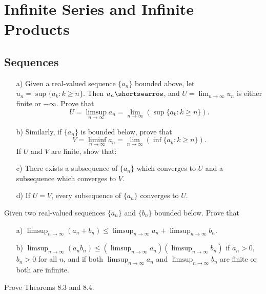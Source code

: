 \chapter{Infinite Series and Infinite Products}
\section{Sequences}

\begin{problembox}
    \begin{itemize}
        \item[a)] Given a real-valued sequence $\{a_n\}$ bounded above, let $u_n = \sup \{a_k : k \geq n\}$. Then $u_n\shortsearrow$, and $U = \lim_{n \to \infty} u_n$ is either finite or $-\infty$. Prove that
        \[
        U = \limsup_{n \to \infty} a_n = \lim_{n \to \infty} (\sup \{a_k : k \geq n\}).
        \]
        \item[b)] Similarly, if $\{a_n\}$ is bounded below, prove that
        \[
        V = \liminf_{n \to \infty} a_n = \lim_{n \to \infty} (\inf \{a_k : k \geq n\}).
        \]
        If $U$ and $V$ are finite, show that:
        \item[c)] There exists a subsequence of $\{a_n\}$ which converges to $U$ and a subsequence which converges to $V$.
        \item[d)] If $U = V$, every subsequence of $\{a_n\}$ converges to $U$.
      \end{itemize}

\end{problembox}

\begin{problembox}
    Given two real-valued sequences $\{a_n\}$ and $\{b_n\}$ bounded below. Prove that
    \begin{itemize}
      \item[a)] $\limsup_{n \to \infty} (a_n + b_n) \leq \limsup_{n \to \infty} a_n + \limsup_{n \to \infty} b_n$.
      \item[b)] $\limsup_{n \to \infty} (a_n b_n) \leq (\limsup_{n \to \infty} a_n)(\limsup_{n \to \infty} b_n)$ if $a_n > 0$, $b_n > 0$ for all $n$, and if both $\limsup_{n \to \infty} a_n$ and $\limsup_{n \to \infty} b_n$ are finite or both are infinite.
    \end{itemize}

\end{problembox}

\begin{problembox}
Prove Theorems 8.3 and 8.4.
\end{problembox}

